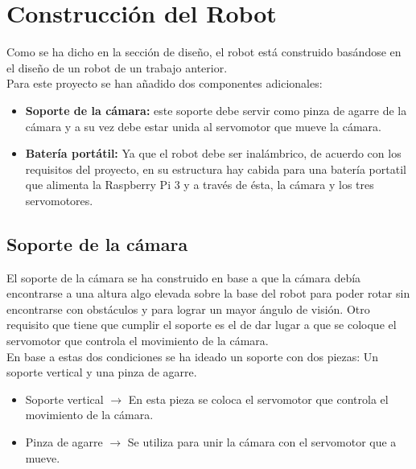 \documentclass[twoside, 11pt]{epstfg}
\begin{document}
\section{Construcción del Robot}
Como se ha dicho en la sección de diseño, el robot está construido basándose en el diseño de un robot de un trabajo anterior.\\
Para este proyecto se han añadido dos componentes adicionales:

\begin{itemize}
	\item \textbf{Soporte de la cámara:} este soporte debe servir como pinza de agarre de la cámara y a su vez debe estar unida al servomotor que mueve la cámara.
	\item \textbf{Batería portátil:} Ya que el robot debe ser inalámbrico, de acuerdo con los requisitos del proyecto, en su estructura hay cabida para una batería portatil que alimenta la Raspberry Pi 3 y a través de ésta, la cámara y los tres servomotores.
\end{itemize}

\subsection{Soporte de la cámara}
El soporte de la cámara se ha construido en base a que la cámara debía encontrarse a una altura algo elevada sobre la base del robot para poder rotar sin encontrarse con obstáculos y para lograr un mayor ángulo de visión. Otro requisito que tiene que cumplir el soporte es el de dar lugar a que se coloque el servomotor que controla el movimiento de la cámara.\\
En base a estas dos condiciones se ha ideado un soporte con dos piezas: Un soporte vertical y una pinza de agarre. 

\begin{itemize}
	\item Soporte vertical $\rightarrow$ En esta pieza se coloca el servomotor que controla el movimiento de la cámara.
	
	\item Pinza de agarre $\rightarrow$ Se utiliza para unir la cámara con el servomotor que a mueve.
\end{itemize}
\end{document}
